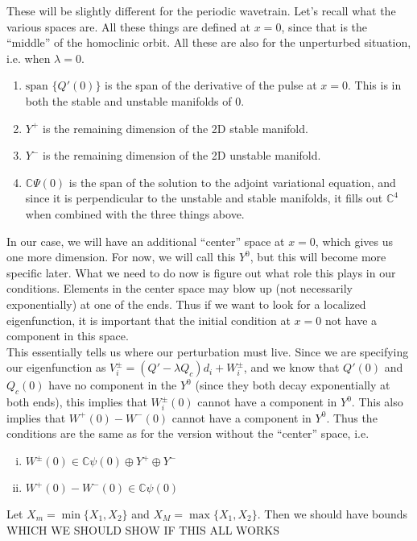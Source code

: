 \documentclass[12pt]{article}
\def\C{{\mathbb C}}
\begin{document}
These will be slightly different for the periodic wavetrain. Let's recall what the various spaces are. All these things are defined at $x = 0$, since that is the ``middle'' of the homoclinic orbit. All these are also for the unperturbed situation, i.e. when $\lambda = 0$.

\begin{enumerate}
	\item $\text{span }\{Q'(0)\}$ is the span of the derivative of the pulse at $x = 0$. This is in both the stable and unstable manifolds of 0.
	\item $Y^+$ is the remaining dimension of the 2D stable manifold.
	\item $Y^-$ is the remaining dimension of the 2D unstable manifold.
	\item $\C \Psi(0)$ is the span of the solution to the adjoint variational equation, and since it is perpendicular to the unstable and stable manifolds, it fills out $\C^4$ when combined with the three things above.
\end{enumerate}

In our case, we will have an additional ``center'' space at $x = 0$, which gives us one more dimension. For now, we will call this $Y^0$, but this will become more specific later. What we need to do now is figure out what role this plays in our conditions. Elements in the center space may blow up (not necessarily exponentially) at one of the ends. Thus if we want to look for a localized eigenfunction, it is important that the initial condition at $x = 0$ not have a component in this space. \\

This essentially tells us where our perturbation must live. Since we are specifying our eigenfunction as $V_i^\pm = (Q' - \lambda Q_c)d_i + W_i^\pm$, and we know that $Q'(0)$ and $Q_c(0)$ have no component in the $Y^0$ (since they both decay exponentially at both ends), this implies that $W_i^\pm(0)$ cannot have a component in $Y^0$. This also implies that $W^+(0) - W^-(0)$ cannot have a component in $Y^0$. Thus the conditions are the same as for the version without the ``center'' space, i.e. 

\begin{enumerate}[(i)]
\item $W^\pm(0) \in \C \psi(0) \oplus Y^+ \oplus Y^-$
\item $W^+(0) - W^-(0) \in \C \psi(0) $
\end{enumerate}

Let $X_m = \min\{ X_1, X_2 \}$ and $X_M = \max\{ X_1, X_2 \}$. Then we should have bounds WHICH WE SHOULD SHOW IF THIS ALL WORKS
\end{document}
